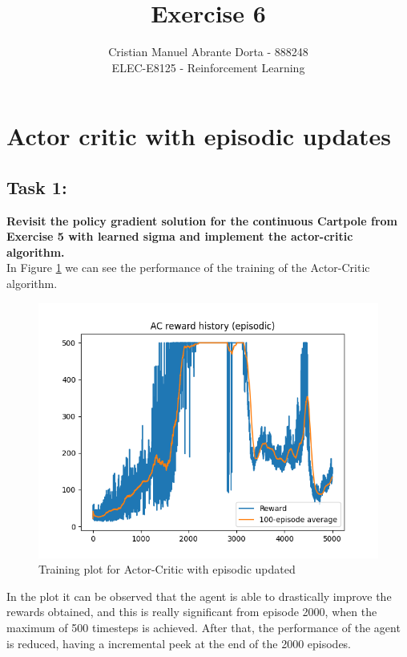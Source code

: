 \documentclass[12pt]{article}
\begin{document}
 
\title{Exercise 6}
\author{Cristian Manuel Abrante Dorta - 888248\\
ELEC-E8125 - Reinforcement Learning}

\maketitle
\section{Actor critic with episodic updates}

\subsection{Task 1:}
\textbf{
Revisit the policy gradient solution for the continuous Cartpole from Exercise 5 with learned sigma and implement the actor-critic algorithm.
}\\

In Figure \ref{fig:task-1} we can see the performance of the training of the Actor-Critic algorithm.

\begin{figure}[ht]
    \centering
    \includegraphics[scale=0.5]{exercise-6/plots/exefcise-6-good-1.png}
    \caption{Training plot for Actor-Critic with episodic updated}
    \label{fig:task-1}
\end{figure}

In the plot it can be observed that the agent is able to drastically improve the rewards obtained, and this is really significant from episode 2000, when the maximum of 500 timesteps is achieved. After that, the performance of the agent is reduced, having a incremental peek at the end of the 2000 episodes.
\end{document}
